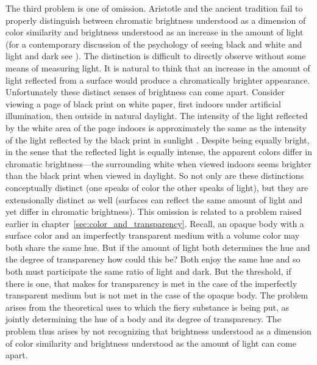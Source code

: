 The third problem is one of omission. Aristotle and the ancient tradition fail to properly distinguish between chromatic brightness understood as a dimension of color similarity and brightness understood as an increase in the amount of light (for a contemporary discussion of the psychology of seeing black and white and light and dark see \citealt{Gilchrist:2006kx}). The distinction is difficult to directly observe without some means of measuring light. It is natural to think that an increase in the amount of light reflected from a surface would produce a chromatically brighter appearance. Unfortunately these distinct senses of brightness can come apart. Consider viewing a page of black print on white paper, first indoors under artificial illumination, then outside in natural daylight. The intensity of the light reflected by the white area of the page indoors is approximately the same as the intensity of the light reflected by the black print in sunlight \citep[199]{Peter-K:1996th}. Despite being equally bright, in the sense that the reflected light is equally intense, the apparent colors differ in chromatic brightness---the surrounding white when viewed indoors seems brighter than the black print when viewed in daylight. So not only are these distinctions conceptually distinct (one speaks of color the other speaks of light), but they are extensionally distinct as well (surfaces can reflect the same amount of light and yet differ in chromatic brightness). This omission is related to a problem raised earlier in chapter~\ref{sec:color_and_transparency}. Recall, an opaque body with a surface color and an imperfectly transparent medium with a volume color may both share the same hue. But if the amount of light both determines the hue and the degree of transparency how could this be? Both enjoy the same hue and so both must participate the same ratio of light and dark. But the threshold, if there is one, that makes for transparency is met in the case of the imperfectly transparent medium but is not met in the case of the opaque body. The problem arises from the theoretical uses to which the fiery substance is being put, as jointly determining the hue of a body and its degree of transparency. The problem thus arises by not recognizing that brightness understood as a dimension of color similarity and brightness understood as the amount of light can come apart.

